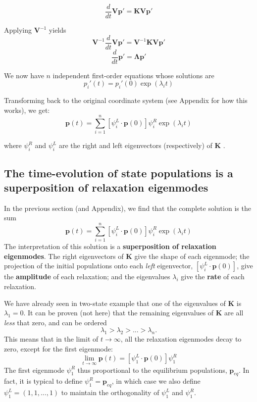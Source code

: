 \documentclass[11pt, oneside]{article}   	%
\begin{document}
$$\frac{d}{dt} \mathbf{V}\mathbf{p}' = \mathbf{K} \mathbf{V}\mathbf{p}'$$



Applying $\mathbf{V}^{-1}$ yields
$$\mathbf{V}^{-1} \frac{d}{dt} \mathbf{V}\mathbf{p}' = \mathbf{V}^{-1} \mathbf{K} \mathbf{V}\mathbf{p}'$$
$$\frac{d}{dt} \mathbf{p}'=  \mathbf{\Lambda} \mathbf{p}'$$

We now have $n$ independent first-order equations whose solutions are
$$p_i'(t) = p_i'(0) \exp (\lambda_i t)$$

Transforming back to the original coordinate system (see Appendix for how this works), we get:
$$\mathbf{p}(t) = \sum_{i=1}^n [\psi^L_i \cdot  \mathbf{p}(0)] \psi^R_i \exp (\lambda_i t)$$

where $\psi_i^R$ and $\psi_i^L$ are the right and left eigenvectors (respectively) of $\mathbf{K}$ .  

\subsection*{The time-evolution of state populations is a superposition of relaxation eigenmodes}

In the previous section (and Appendix), we find that the complete solution is the sum
\[
\boxed{
\mathbf{p}(t) = \sum_{i=1}^n [\psi^L_i \cdot  \mathbf{p}(0)] \psi^R_i \exp (\lambda_i t)
}
\]
The interpretation of this solution is a \textbf{superposition of relaxation eigenmodes}. The right eigenvectors of $\mathbf{K}$ give the shape of each eigenmode; the projection of the initial populations onto each \textit{left} eigenvector, $[\psi^L_i \cdot  \mathbf{p}(0)]$, give the \textbf{amplitude} of each relaxation; and the eigenvalues $\lambda_i$ give the \textbf{rate} of each relaxation.

We have already seen in two-state example that one of the eigenvalues of $\mathbf{K}$ is $\lambda_1 = 0$.  It can be proven (not here) that the remaining eigenvalues of  $\mathbf{K}$ are all \textit{less} that zero, and can be ordered 
\[
\lambda_1 > \lambda_2 > ... > \lambda_n.
\]
This means that in the limit of $t \rightarrow \infty$, all the relaxation eigenmodes decay to zero, except for the first eigenmode:
\[
\lim_{t \rightarrow \infty} \mathbf{p}(t) =  [\psi^L_1 \cdot  \mathbf{p}(0)] \psi^R_1 
\]
The first eigenmode $\psi_1^R$ thus proportional to the equilibrium populations, $\mathbf{p}_{eq}$.  In fact, it is typical to define $\psi^R_1 = \mathbf{p}_{eq}$, in which case we also define $\psi^L_1 = (1,1,...,1)$ to maintain the orthogonality of $\psi^L_1$ and $\psi^R_1$. 
\end{document}
